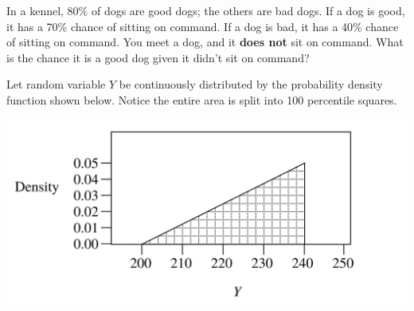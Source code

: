 \documentclass[12pt,letterpaper,addpoints]{exam}
\begin{document}
\begin{questions}
\question[10] In a kennel, 80\% of dogs are good dogs; the others are bad dogs. If a dog is good, it has a 70\% chance of sitting on command. If a dog is bad, it has a 40\% chance of sitting on command. You meet a dog, and it {\bf does not} sit on command. What is the chance it is a good dog given it didn't sit on command?

\newpage

\question[10] Let random variable $Y$ be continuously distributed by the probability density function shown below. Notice the entire area is split into 100 percentile squares.
\begin{center}
\includegraphics[scale=1]{figures/cd.png}
\end{center}
\end{questions}
\end{document}
